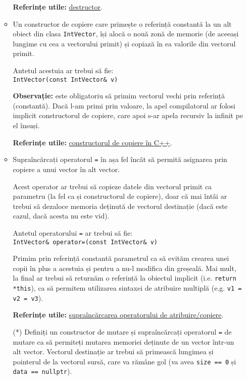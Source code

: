 \begin{enumerate}
\begin{itemize}
        \textbf{Referințe utile:} \href{https://en.cppreference.com/w/cpp/language/destructor}{destructor}.

        \item Un constructor de copiere care primește o referință constantă la un alt obiect din clasa \texttt{IntVector}, își alocă o nouă zonă de memorie (de aceeași lungime cu cea a vectorului primit) și copiază în ea valorile din vectorul primit.

        Antetul acestuia ar trebui să fie: \\[0.5em]
        \texttt{IntVector(const IntVector\& v)}

        \textbf{Observație:} este obligatoriu să primim vectorul vechi prin referință (constantă). Dacă l-am primi prin valoare, la apel compilatorul ar folosi implicit constructorul de copiere, care apoi s-ar apela recursiv la infinit pe el însuși.

        \textbf{Referințe utile:} \href{https://www.geeksforgeeks.org/copy-constructor-in-cpp/}{constructorul de copiere în C++}.

        \item Supraîncărcați operatorul \texttt{=} în așa fel încât să permită asignarea prin copiere a unui vector în alt vector. 
        
        Acest operator ar trebui să copieze datele din vectorul primit ca parametru (la fel ca și constructorul de copiere), doar că mai întâi ar trebui să dezaloce memoria deținută de vectorul destinație (dacă este cazul, dacă acesta nu este vid).

        Antetul operatorului \texttt{=} ar trebui să fie:\\[0.5em]
        \texttt{IntVector\& operator=(const IntVector\& v)}

        Primim prin referință constantă parametrul ca să evităm crearea unei copii în plus a acestuia și pentru a nu-l modifica din greșeală. Mai mult, la final ar trebui să returnăm o referință la obiectul implicit (i.e. \texttt{return *this}), ca să permitem utilizarea sintaxei de atribuire multiplă (e.g. \texttt{v1 = v2 = v3}).
    
        \textbf{Referințe utile:} \href{https://www.geeksforgeeks.org/cpp-assignment-operator-overloading/}{supraîncărcarea operatorului de atribuire/copiere}.

        \item[(*)] Definiți un constructor de mutare și supraîncărcați operatorul \texttt{=} de mutare ca să permiteți mutarea memoriei deținute de un vector într-un alt vector. Vectorul destinație ar trebui să primească lungimea și pointerul de la vectorul sursă, care va rămâne gol (va avea \texttt{size == 0} și \texttt{data == nullptr}).


\end{itemize}
\end{enumerate}
